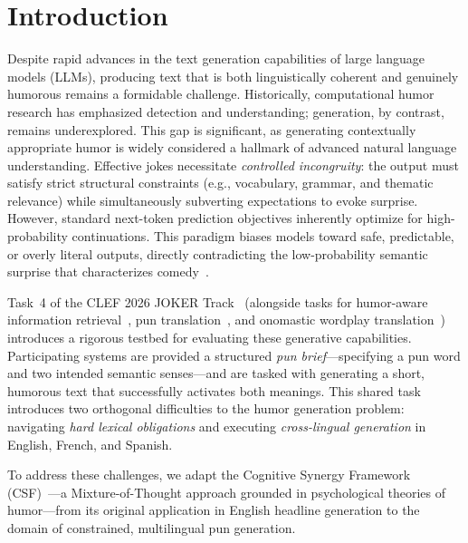 \documentclass[]{ceurart}
\begin{document}
\maketitle

\section{Introduction}
\label{sec:introduction}
Despite rapid advances in the text generation capabilities of large language models (LLMs), producing text that is both linguistically coherent and genuinely humorous remains a formidable challenge. Historically, computational humor research has emphasized detection and understanding; generation, by contrast, remains underexplored. This gap is significant, as generating contextually appropriate humor is widely considered a hallmark of advanced natural language understanding. Effective jokes necessitate \emph{controlled incongruity}: the output must satisfy strict structural constraints (e.g., vocabulary, grammar, and thematic relevance) while simultaneously subverting expectations to evoke surprise. However, standard next-token prediction objectives inherently optimize for high-probability continuations. This paradigm biases models toward safe, predictable, or overly literal outputs, directly contradicting the low-probability semantic surprise that characterizes comedy~\cite{ajayi2026humorgen}.

Task~4 of the CLEF 2026 JOKER Track~\cite{ermakova2026jokertrack,kuzmin2026task4} (alongside tasks for humor-aware information retrieval~\cite{vachharajani2026task1}, pun translation~\cite{ermakova2026task2}, and onomastic wordplay translation~\cite{ermakova2026task3}) introduces a rigorous testbed for evaluating these generative capabilities. Participating systems are provided a structured \emph{pun brief}—specifying a pun word and two intended semantic senses—and are tasked with generating a short, humorous text that successfully activates both meanings. This shared task introduces two orthogonal difficulties to the humor generation problem: navigating \emph{hard lexical obligations} and executing \emph{cross-lingual generation} in English, French, and Spanish.

To address these challenges, we adapt the Cognitive Synergy Framework (CSF)~\cite{ajayi2026humorgen}—a Mixture-of-Thought approach grounded in psychological theories of humor—from its original application in English headline generation to the domain of constrained, multilingual pun generation.
\end{document}

